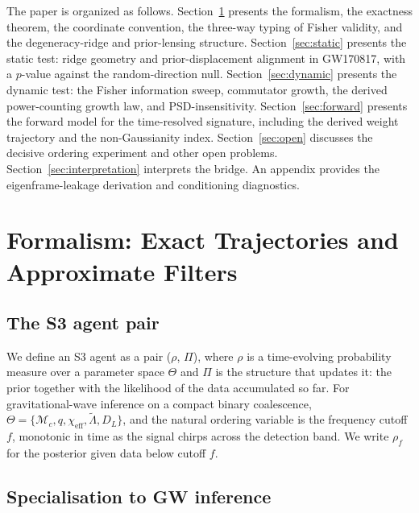 \documentclass[twocolumn,prd,showpacs,superscriptaddress]{revtex4-2}
\newcommand{\Mchirp}{\mathcal{M}_c}
\newcommand{\Lambdatilde}{\tilde{\Lambda}}
\newcommand{\chieff}{\chi_{\text{eff}}}
\newcommand{\Dl}{D_L}
\begin{document}
The paper is organized as follows.
Section~\ref{sec:formalism} presents the formalism, the exactness
theorem, the coordinate convention, the three-way typing of Fisher
validity, and the degeneracy-ridge and prior-lensing structure.
Section~\ref{sec:static} presents the static test: ridge geometry and
prior-displacement alignment in GW170817, with a $p$-value against
the random-direction null.
Section~\ref{sec:dynamic} presents the dynamic test: the Fisher
information sweep, commutator growth, the derived power-counting
growth law, and PSD-insensitivity.
Section~\ref{sec:forward} presents the forward model for the
time-resolved signature, including the derived weight trajectory
and the non-Gaussianity index.
Section~\ref{sec:open} discusses the decisive ordering experiment
and other open problems.
Section~\ref{sec:interpretation} interprets the bridge.
An appendix provides the eigenframe-leakage derivation and
conditioning diagnostics.

\section{Formalism: Exact Trajectories and Approximate Filters}
\label{sec:formalism}

\subsection{The S3 agent pair}

We define an S3 agent as a pair ($\rho$, $\Pi$), where $\rho$ is a
time-evolving probability measure over a parameter space $\Theta$ and
$\Pi$ is the structure that updates it: the prior together with the
likelihood of the data accumulated so far.  For gravitational-wave
inference on a compact binary coalescence,
$\Theta = \{\Mchirp, q, \chieff, \Lambdatilde, \Dl\}$, and the natural
ordering variable is the frequency cutoff $f$, monotonic in time as the
signal chirps across the detection band.  We write $\rho_f$ for the
posterior given data below cutoff $f$.

\subsection{Specialisation to GW inference}
\end{document}
